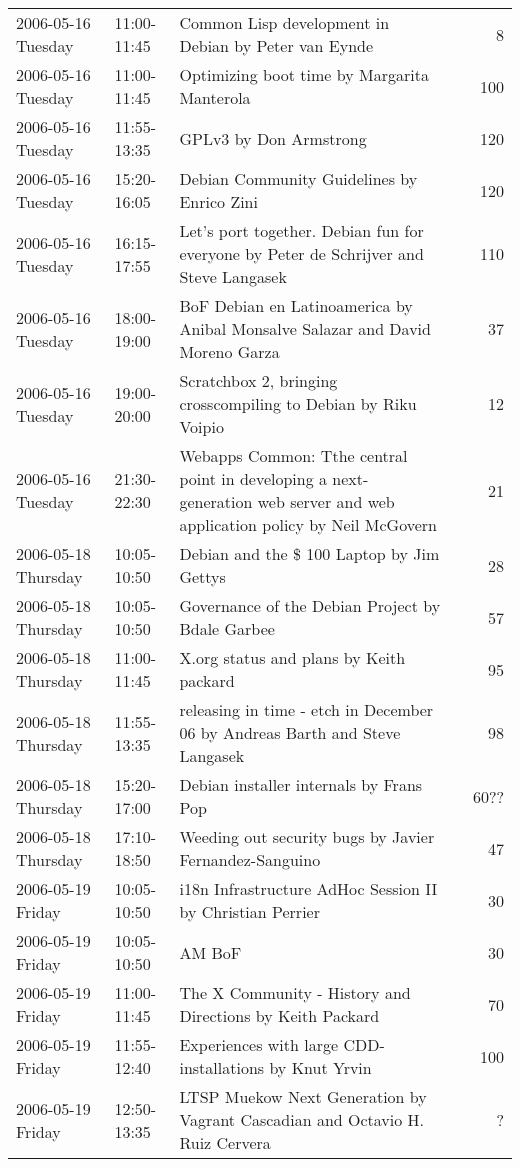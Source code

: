 \documentclass[cjk,dvipdfmx]{beamer}
\begin{document}
\begin{frame}
\begin{center}
{\begin{tabular}{|l|l|p{20em}|r|}
 2006-05-16 Tuesday & 11:00-11:45 & Common Lisp development in Debian by Peter van Eynde &  8 \\
 2006-05-16 Tuesday & 11:00-11:45 & Optimizing boot time by Margarita Manterola &  100 \\
 2006-05-16 Tuesday & 11:55-13:35 & GPLv3 by Don Armstrong &  120 \\
 2006-05-16 Tuesday & 15:20-16:05 & Debian Community Guidelines by Enrico Zini &  120 \\
 2006-05-16 Tuesday & 16:15-17:55 & Let's port together. Debian fun for everyone by Peter de Schrijver and Steve Langasek &  110 \\
 2006-05-16 Tuesday & 18:00-19:00 & BoF Debian en Latinoamerica by Anibal Monsalve Salazar and David Moreno Garza &  37 \\
 2006-05-16 Tuesday & 19:00-20:00 & Scratchbox 2, bringing crosscompiling to Debian by Riku Voipio &  12 \\
 2006-05-16 Tuesday & 21:30-22:30 & Webapps Common: Tthe central point in developing a next-generation web server and web application policy by Neil McGovern &  21 \\
 2006-05-18 Thursday & 10:05-10:50 & Debian and the \$ 100 Laptop by Jim Gettys &  28 \\
 2006-05-18 Thursday & 10:05-10:50 & Governance of the Debian Project by Bdale Garbee &  57 \\
 2006-05-18 Thursday & 11:00-11:45 & X.org status and plans by Keith packard &  95 \\
 2006-05-18 Thursday & 11:55-13:35 & releasing in time - etch in December 06 by Andreas Barth and Steve Langasek &  98 \\
 2006-05-18 Thursday & 15:20-17:00 & Debian installer internals by Frans Pop &  ~~60?? \\
 2006-05-18 Thursday & 17:10-18:50 & Weeding out security bugs by Javier Fernandez-Sanguino &  47 \\
 2006-05-19 Friday & 10:05-10:50 & i18n Infrastructure AdHoc Session II by Christian Perrier &  ~30 \\
 2006-05-19 Friday & 10:05-10:50 & AM BoF &  30 \\
 2006-05-19 Friday & 11:00-11:45 & The X Community - History and Directions by Keith Packard &  70 \\
 2006-05-19 Friday & 11:55-12:40 & Experiences with large CDD-installations by Knut Yrvin &  ~100 \\
 2006-05-19 Friday & 12:50-13:35 & LTSP Muekow Next Generation by Vagrant Cascadian and Octavio H. Ruiz Cervera &  ? \\

\end{tabular}}
\end{center}
\end{frame}
\end{document}
